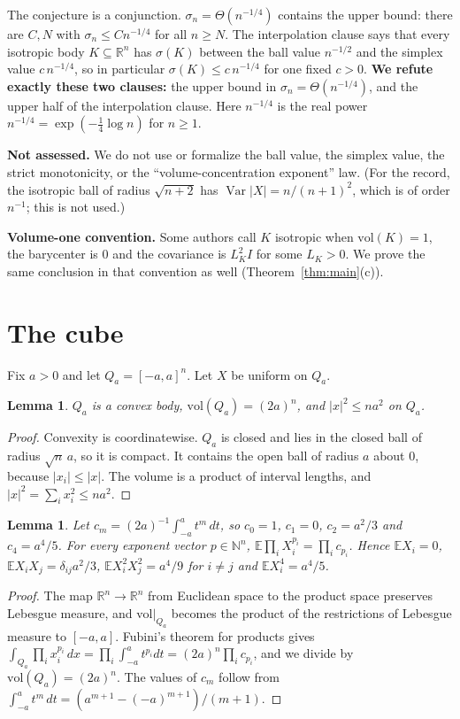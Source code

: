 \documentclass[11pt]{article}
\newtheorem{lemma}[theorem]{Lemma}
\theoremstyle{definition}
\theoremstyle{remark}
\begin{document}
The conjecture is a conjunction. $\sigma_n=\Theta(n^{-1/4})$ contains the upper bound: there are
$C,N$ with $\sigma_n\le C n^{-1/4}$ for all $n\ge N$. The interpolation clause says that every
isotropic body $K\subseteq\mathbb R^n$ has $\sigma(K)$ between the ball value $n^{-1/2}$ and the
simplex value $c\,n^{-1/4}$, so in particular $\sigma(K)\le c\,n^{-1/4}$ for one fixed $c>0$.
\textbf{We refute exactly these two clauses:} the upper bound in $\sigma_n=\Theta(n^{-1/4})$, and
the upper half of the interpolation clause. Here $n^{-1/4}$ is the real power
$n^{-1/4}=\exp(-\tfrac14\log n)$ for $n\ge1$.

\textbf{Not assessed.} We do not use or formalize the ball value, the simplex value, the strict
monotonicity, or the ``volume-concentration exponent'' law. (For the record, the isotropic ball of
radius $\sqrt{n+2}$ has $\operatorname{Var}|X|=n/(n+1)^2$, which is of order $n^{-1}$; this is not
used.)

\textbf{Volume-one convention.} Some authors call $K$ isotropic when $\mathrm{vol}(K)=1$, the
barycenter is $0$ and the covariance is $L_K^2I$ for some $L_K>0$. We prove the same conclusion in
that convention as well (Theorem~\ref{thm:main}(c)).

\section{The cube}

Fix $a>0$ and let $Q_a=[-a,a]^n$. Let $X$ be uniform on $Q_a$.

\begin{lemma}\label{lem:body}
$Q_a$ is a convex body, $\mathrm{vol}(Q_a)=(2a)^n$, and $|x|^2\le na^2$ on $Q_a$.
\end{lemma}
\begin{proof}
Convexity is coordinatewise. $Q_a$ is closed and lies in the closed ball of radius
$\sqrt{n}\,a$, so it is compact. It contains the open ball of radius $a$ about $0$, because
$|x_i|\le|x|$. The volume is a product of interval lengths, and
$|x|^2=\sum_i x_i^2\le na^2$.
\end{proof}

\begin{lemma}\label{lem:mom}
Let $c_m=(2a)^{-1}\int_{-a}^a t^m\,dt$, so $c_0=1$, $c_1=0$, $c_2=a^2/3$ and $c_4=a^4/5$. For
every exponent vector $p\in\mathbb N^n$, $\mathbb E\prod_i X_i^{p_i}=\prod_i c_{p_i}$. Hence
$\mathbb E X_i=0$, $\mathbb E X_iX_j=\delta_{ij}a^2/3$, $\mathbb E X_i^2X_j^2=a^4/9$ for $i\ne j$
and $\mathbb E X_i^4=a^4/5$.
\end{lemma}
\begin{proof}
The map $\mathbb R^n\to\mathbb R^n$ from Euclidean space to the product space preserves Lebesgue
measure, and $\mathrm{vol}|_{Q_a}$ becomes the product of the restrictions of Lebesgue measure to
$[-a,a]$. Fubini's theorem for products gives
$\int_{Q_a}\prod_i x_i^{p_i}\,dx=\prod_i\int_{-a}^a t^{p_i}dt=(2a)^n\prod_ic_{p_i}$, and we divide by
$\mathrm{vol}(Q_a)=(2a)^n$. The values of $c_m$ follow from
$\int_{-a}^at^m\,dt=(a^{m+1}-(-a)^{m+1})/(m+1)$.
\end{proof}
\end{document}
